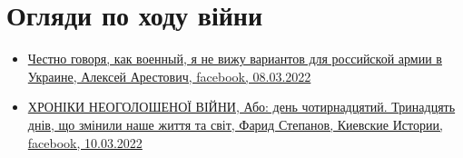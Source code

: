  
 
 
 
 
\section{Огляди по ходу війни}
\label{sec:topics.vojna.ogljady}

\begin{itemize} %
\item \hyperlink{08_03_2022.fb.arestovich_alexei.1.varianty}{%
Честно говоря, как военный, я не вижу вариантов для российской армии в Украине, Алексей Арестович, %
facebook, 08.03.2022%
}

\item \hyperlink{10_03_2022.fb.fb_group.story_kiev_ua.1.hroniki}{%
ХРОНІКИ НЕОГОЛОШЕНОЇ ВІЙНИ, Або: день чотирнадцятий. Тринадцять днів, що змінили наше життя та світ, %
Фарид Степанов, Киевские Истории, facebook, 10.03.2022%
}

\end{itemize} %
